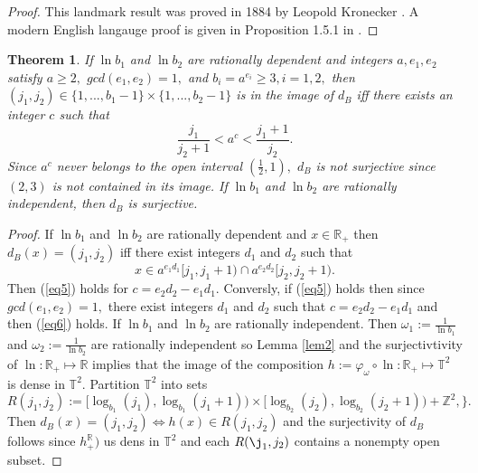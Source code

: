 \documentclass[14pt, twoside, a4paper]{article} %
\newtheorem{theo}{Theorem}                                                 %
\newtheorem{proof}{Proof}                                              %
\begin{document}
\begin{proof}
This landmark result was proved in 1884 by Leopold Kronecker \cite{kronecker}. A modern English langauge proof is given in
Proposition 1.5.1 in \cite{katok}.
\end{proof}
%
\begin{theo}\label{thm1}
If $\ln b_1$ and $\ln b_2$ are rationally dependent and integers $a, e_1, e_2$ satisfy $a \geq 2,$ 
$gcd(e_1,e_2) = 1,$ and $b_i = a^{e_i} \geq 3, i = 1, 2,$ 
then 
$(j_1,j_2) \in \{1,...,b_1-1\} \times \{1,...,b_2-1\}$
is in the image of
$d_B$ iff there exists an integer $c$ such that
%
\begin{equation}\label{eq5}
\frac{j_1}{j_2+1} < a^c < 
\frac{j_1+1}{j_2}.
\end{equation}
%
Since $a^c$ never belongs to  the open interval 
$(\frac{1}{2},1),$ $d_B$ is not surjective since $(2,3)$ is 
not contained in its image.
If $\ln b_1$ and $\ln b_2$ are rationally independent, then $d_B$ is surjective.
\end{theo}
\begin{proof} If $\ln b_1$ and $\ln b_2$ are rationally dependent 
and $x \in \mathbb R_+$ then $d_B(x) = (j_1,j_2)$ iff 
there exist integers $d_1$ and $d_2$ such that
%
\begin{equation}\label{eq6}
x \in a^{e_1d_1}[j_1, j_1+1) \cap a^{e_2d_2}[j_2, j_2+1).
\end{equation}
%
Then 
(\ref{eq5}) holds for
$c = e_2d_2 - e_1d_1.$ Conversly, if
(\ref{eq5}) holds then since $gcd(e_1,e_2) = 1,$ there exist integers $d_1$ and $d_2$ such that $c = e_2d_2 - e_1d_1$ and then (\ref{eq6}) holds.
%
If $\ln b_1$ and $\ln b_2$ are rationally independent. Then 
$\omega_1 := \frac{1}{\ln b_1}$ and 
$\omega_2 := \frac{1}{\ln b_2}$
are rationally independent so Lemma \ref{lem2} 
and the surjectivtivity of $\ln : \mathbb R_+ \mapsto \mathbb R$ implies that the image of the composition 
$h := \varphi_\omega \circ \ln : \mathbb R_+ \mapsto \mathbb T^2$ is dense in $\mathbb T^2.$
Partition $\mathbb T^2$ into sets 
%
$$R(j_1,j_2) := 
[\log_{b_1}(j_1), \log_{b_1}(j_1+1)) \times 
[\log_{b_2}(j_2), \log_{b_2}(j_2+1)) + \mathbb Z^2,
\}.$$ 
%
Then $d_B(x) = (j_1,j_2) \iff h(x) \in R(j_1,j_2)$ and
the surjectivity of $d_B$ follows since $h^\mathbb R_+)$ 
us dens in $\mathbb T^2$ and each $R(\j_1,j_2)$ contains
a nonempty open subset.
\end{proof}
%
\end{document}
